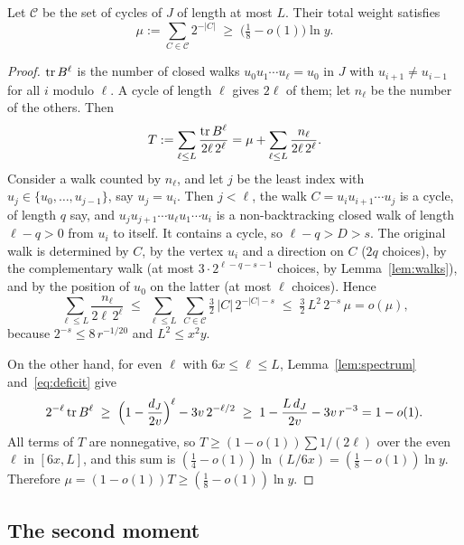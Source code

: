 \begin{lemma}\label{lem:weight}
Let $\mathcal{C}$ be the set of cycles of $J$ of length at most $L$. Their total weight satisfies
\[
  \mu:=\sum_{C\in\mathcal{C}}2^{-|C|}\;\ge\;\bigl(\tfrac18-o(1)\bigr)\ln y .
\]
\end{lemma}

\begin{proof}
$\operatorname{tr} B^{\ell}$ is the number of closed walks $u_0u_1\cdots u_\ell=u_0$ in $J$ with
$u_{i+1}\ne u_{i-1}$ for all $i$ modulo $\ell$. A cycle of length $\ell$ gives $2\ell$ of them; let
$n_\ell$ be the number of the others. Then
\[
  T:=\sum_{\ell\le L}\frac{\operatorname{tr} B^{\ell}}{2\ell\,2^{\ell}}=\mu+\sum_{\ell\le L}\frac{n_\ell}{2\ell\,2^{\ell}} .
\]
Consider a walk counted by $n_\ell$, and let $j$ be the least index with
$u_j\in\{u_0,\dots,u_{j-1}\}$, say $u_j=u_i$. Then $j<\ell$, the walk $C=u_iu_{i+1}\cdots u_j$ is a
cycle, of length $q$ say, and $u_ju_{j+1}\cdots u_\ell u_1\cdots u_i$ is a non-backtracking closed
walk of length $\ell-q>0$ from $u_i$ to itself. It contains a cycle, so $\ell-q>D>s$. The original
walk is determined by $C$, by the vertex $u_i$ and a direction on $C$ ($2q$ choices), by the
complementary walk (at most $3\cdot2^{\ell-q-s-1}$ choices, by Lemma~\ref{lem:walks}), and by the
position of $u_0$ on the latter (at most $\ell$ choices). Hence
\[
  \sum_{\ell\le L}\frac{n_\ell}{2\ell\,2^{\ell}}
  \;\le\;\sum_{\ell\le L}\ \sum_{C\in\mathcal{C}}\tfrac32\,|C|\,2^{-|C|-s}
  \;\le\;\tfrac32\,L^{2}\,2^{-s}\,\mu=o(\mu),
\]
because $2^{-s}\le8\,r^{-1/20}$ and $L^{2}\le x^{2}y$.

On the other hand, for even $\ell$ with $6x\le\ell\le L$, Lemma~\ref{lem:spectrum}
and~\eqref{eq:deficit} give
\[
  2^{-\ell}\operatorname{tr} B^{\ell}\;\ge\;\Bigl(1-\frac{d_J}{2v}\Bigr)^{\ell}-3v\,2^{-\ell/2}
  \;\ge\;1-\frac{L\,d_J}{2v}-3v\,r^{-3}=1-o(1).
\]
All terms of $T$ are nonnegative, so $T\ge(1-o(1))\sum1/(2\ell)$ over the even $\ell$ in $[6x,L]$,
and this sum is $(\frac14-o(1))\ln(L/6x)=(\frac18-o(1))\ln y$. Therefore
$\mu=(1-o(1))T\ge(\frac18-o(1))\ln y$.
\end{proof}

\subsection{The second moment}


